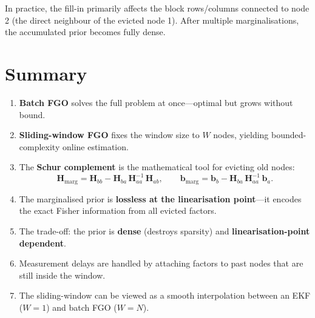 \documentclass[11pt,a4paper]{article}
\newcommand{\bb}{\bm{b}}
\newcommand{\bH}{\bm{H}}
\theoremstyle{definition}
\theoremstyle{plain}
\begin{document}
In practice, the fill-in primarily affects the block rows/columns
connected to node 2 (the direct neighbour of the evicted node 1).
After multiple marginalisations, the accumulated prior becomes fully
dense.

\section{Summary}
\label{sec:summary}

\begin{enumerate}
  \item \textbf{Batch FGO} solves the full problem at once—optimal but
    grows without bound.
  \item \textbf{Sliding-window FGO} fixes the window size to $W$ nodes,
    yielding bounded-complexity online estimation.
  \item The \textbf{Schur complement} is the mathematical tool for
    evicting old nodes:
    \[
      \bH_{\text{marg}} = \bH_{bb} - \bH_{ba}\,\bH_{aa}^{-1}\,\bH_{ab},
      \qquad
      \bb_{\text{marg}} = \bb_b - \bH_{ba}\,\bH_{aa}^{-1}\,\bb_a.
    \]
  \item The marginalised prior is \textbf{lossless at the linearisation
    point}—it encodes the exact Fisher information from all evicted
    factors.
  \item The trade-off: the prior is \textbf{dense} (destroys sparsity) and
    \textbf{linearisation-point dependent}.
  \item Measurement delays are handled by attaching factors to past nodes
    that are still inside the window.
  \item The sliding-window can be viewed as a smooth interpolation between
    an EKF ($W = 1$) and batch FGO ($W = N$).
\end{enumerate}
\end{document}
